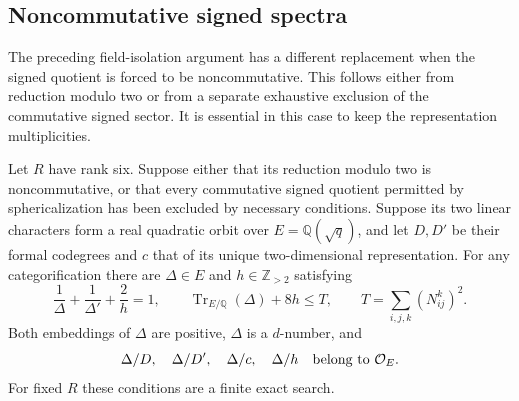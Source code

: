\subsection{Noncommutative signed spectra}
\label{sec:r3-noncommutative}

The preceding field-isolation argument has a different replacement
when the signed quotient is forced to be noncommutative. This follows
either from reduction modulo two or from a separate exhaustive
exclusion of the commutative signed sector. It is essential in this
case to keep the representation multiplicities.

\begin{proposition}\label{prop:r3-noncommutative-spectrum}
Let $R$ have rank six. Suppose either that its reduction modulo two
is noncommutative, or that every commutative signed quotient permitted
by sphericalization has been excluded by necessary conditions.
Suppose its two linear characters form a real quadratic orbit
over $E=\mathbb Q(\sqrt q)$, and let $D,D'$ be their formal
codegrees and $c$ that of its unique two-dimensional representation.
For any categorification there are $\Delta\in E$ and
$h\in\mathbb Z_{>2}$ satisfying
\[
 \frac1\Delta+\frac1{\Delta'}+\frac2h=1,
 \qquad \operatorname{Tr}_{E/\mathbb Q}(\Delta)+8h\leq T,
 \qquad T=\sum_{i,j,k}(N_{ij}^k)^2.
\]
Both embeddings of $\Delta$ are positive, $\Delta$ is a
$d$-number, and
\[
 \Delta/D,\quad \Delta/D',\quad \Delta/c,\quad \Delta/h
 \quad\hbox{belong to }\mathcal O_E.
\]
For fixed $R$ these conditions are a finite exact search.
\end{proposition}
